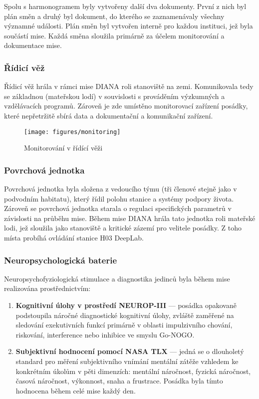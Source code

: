 Spolu s harmonogramem byly vytvořeny další dva dokumenty. První z nich byl plán
směn a druhý byl dokument, do kterého se zaznamenávaly všechny významné
události. Plán směn byl vytvořen interně pro každou instituci, jež byla součástí
mise. Každá směna sloužila primárně za účelem monitorování a dokumentace mise.

\subsubsection{Řídicí věž}
\label{subsubsec:ridici_vez}
Řídicí věž hrála v rámci mise DIANA roli stanoviště na zemi. Komunikovala tedy
se základnou (mateřskou lodí) v souvislosti s prováděním výzkumných a
vzdělávacích programů. Zároveň je zde umístěno monitorovací zařízení posádky,
které nepřetržitě sbírá data a dokumentační a komunikační zařízení. 

\begin{figure}[h]
    \begin{center}
        \texttt{[image: figures/monitoring]}
        \caption{Monitorování v řídící věži}
        \label{fig:monitoring}
    \end{center}
\end{figure}

\subsubsection{Povrchová jednotka}
\label{subsubsec:povrchova_jednotka}
Povrchová jednotka byla složena z vedoucího týmu (tři členové stejně jako v
podvodním habitatu), který řídil polohu stanice a systémy podpory života.
Zároveň se povrchová jednotka starala o regulaci specifických parametrů v
závislosti na průběhu mise. Během mise DIANA hrála tato jednotka roli mateřské
lodi, jež sloužila jako stanoviště a kritické zázemí pro velitele posádky. Z
toho místa probíhá ovládání stanice H03 DeepLab. 

\subsubsection{Neuropsychologická baterie}
\label{subsubsec:neuro_testy}
Neuropsychofyziologická stimulace a diagnostika jedinců byla během mise
realizována prostřednictvím:
\begin{enumerate}
    \item \textbf{Kognitivní úlohy v prostředí NEUROP-III} --- posádka opakovaně
    podstoupila náročné diagnostické kognitivní úlohy, zvláště zaměřené na
    sledování exekutivních funkcí primárně v oblasti impulzivního chování,
    riskování, interference nebo inhibice ve smyslu Go-NOGO.
    \item \textbf{Subjektivní hodnocení pomocí NASA TLX} --- jedná se o
    dlouholetý standard pro měření subjektivního vnímání mentální zátěže
    vzhledem ke konkrétním úkolům v pěti dimenzích: mentální náročnost, fyzická
    náročnost, časová náročnost, výkonnost, snaha a frustrace. Posádka byla
    tímto hodnocena během celé mise každý den.
\end{enumerate}


